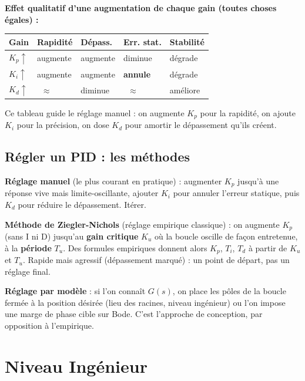 \documentclass[12pt,a4paper,twoside]{book}
\begin{document}
\begin{pratique}
\textbf{Effet qualitatif d'une augmentation de chaque gain (toutes choses égales) :}
\begin{center}
\renewcommand{\arraystretch}{1.35}
\begin{tabular}{p{1.8cm}p{2.2cm}p{2.3cm}p{2.2cm}p{2.0cm}}
\toprule
\textbf{Gain} & \textbf{Rapidité} & \textbf{Dépass.} & \textbf{Err. stat.} & \textbf{Stabilité} \\
\midrule
$K_p \uparrow$ & augmente & augmente & diminue & dégrade \\
$K_i \uparrow$ & augmente & augmente & \textbf{annule} & dégrade \\
$K_d \uparrow$ & ~$\approx$ & diminue & ~$\approx$ & améliore \\
\bottomrule
\end{tabular}
\end{center}
Ce tableau guide le réglage manuel : on augmente $K_p$ pour la rapidité, on ajoute $K_i$ pour la précision, on dose $K_d$ pour amortir le dépassement qu'ils créent.
\end{pratique}

\subsection{Régler un PID : les méthodes}

\begin{formule}
\textbf{Réglage manuel} (le plus courant en pratique) : augmenter $K_p$ jusqu'à une réponse vive mais limite-oscillante, ajouter $K_i$ pour annuler l'erreur statique, puis $K_d$ pour réduire le dépassement. Itérer.

\textbf{Méthode de Ziegler-Nichols} (réglage empirique classique) : on augmente $K_p$ (sans I ni D) jusqu'au \textbf{gain critique} $K_u$ où la boucle oscille de façon entretenue, à la \textbf{période} $T_u$. Des formules empiriques donnent alors $K_p$, $T_i$, $T_d$ à partir de $K_u$ et $T_u$. Rapide mais agressif (dépassement marqué) : un point de départ, pas un réglage final.

\textbf{Réglage par modèle} : si l'on connaît $G(s)$, on place les pôles de la boucle fermée à la position désirée (lieu des racines, niveau ingénieur) ou l'on impose une marge de phase cible sur Bode. C'est l'approche de conception, par opposition à l'empirique.
\end{formule}

\section{Niveau Ingénieur}
\end{document}
